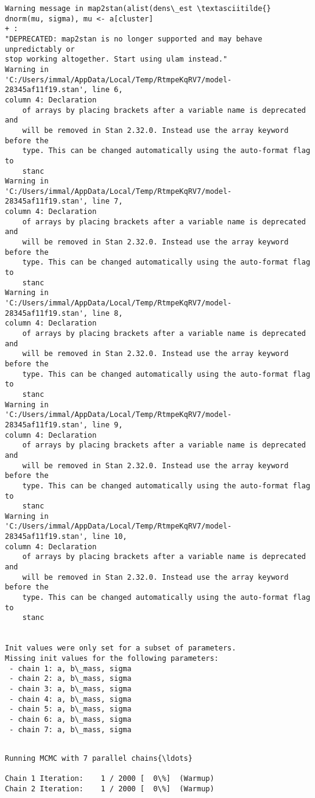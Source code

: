 \documentclass[11pt]{article}
\begin{document}
    \begin{Verbatim}[commandchars=\\\{\}]
Warning message in map2stan(alist(dens\_est \textasciitilde{} dnorm(mu, sigma), mu <- a[cluster]
+ :
"DEPRECATED: map2stan is no longer supported and may behave unpredictably or
stop working altogether. Start using ulam instead."
Warning in
'C:/Users/immal/AppData/Local/Temp/RtmpeKqRV7/model-28345af11f19.stan', line 6,
column 4: Declaration
    of arrays by placing brackets after a variable name is deprecated and
    will be removed in Stan 2.32.0. Instead use the array keyword before the
    type. This can be changed automatically using the auto-format flag to
    stanc
Warning in
'C:/Users/immal/AppData/Local/Temp/RtmpeKqRV7/model-28345af11f19.stan', line 7,
column 4: Declaration
    of arrays by placing brackets after a variable name is deprecated and
    will be removed in Stan 2.32.0. Instead use the array keyword before the
    type. This can be changed automatically using the auto-format flag to
    stanc
Warning in
'C:/Users/immal/AppData/Local/Temp/RtmpeKqRV7/model-28345af11f19.stan', line 8,
column 4: Declaration
    of arrays by placing brackets after a variable name is deprecated and
    will be removed in Stan 2.32.0. Instead use the array keyword before the
    type. This can be changed automatically using the auto-format flag to
    stanc
Warning in
'C:/Users/immal/AppData/Local/Temp/RtmpeKqRV7/model-28345af11f19.stan', line 9,
column 4: Declaration
    of arrays by placing brackets after a variable name is deprecated and
    will be removed in Stan 2.32.0. Instead use the array keyword before the
    type. This can be changed automatically using the auto-format flag to
    stanc
Warning in
'C:/Users/immal/AppData/Local/Temp/RtmpeKqRV7/model-28345af11f19.stan', line 10,
column 4: Declaration
    of arrays by placing brackets after a variable name is deprecated and
    will be removed in Stan 2.32.0. Instead use the array keyword before the
    type. This can be changed automatically using the auto-format flag to
    stanc


Init values were only set for a subset of parameters.
Missing init values for the following parameters:
 - chain 1: a, b\_mass, sigma
 - chain 2: a, b\_mass, sigma
 - chain 3: a, b\_mass, sigma
 - chain 4: a, b\_mass, sigma
 - chain 5: a, b\_mass, sigma
 - chain 6: a, b\_mass, sigma
 - chain 7: a, b\_mass, sigma


    \end{Verbatim}

    \begin{Verbatim}[commandchars=\\\{\}]
Running MCMC with 7 parallel chains{\ldots}

Chain 1 Iteration:    1 / 2000 [  0\%]  (Warmup)
Chain 2 Iteration:    1 / 2000 [  0\%]  (Warmup)
    \end{Verbatim}
\end{document}
